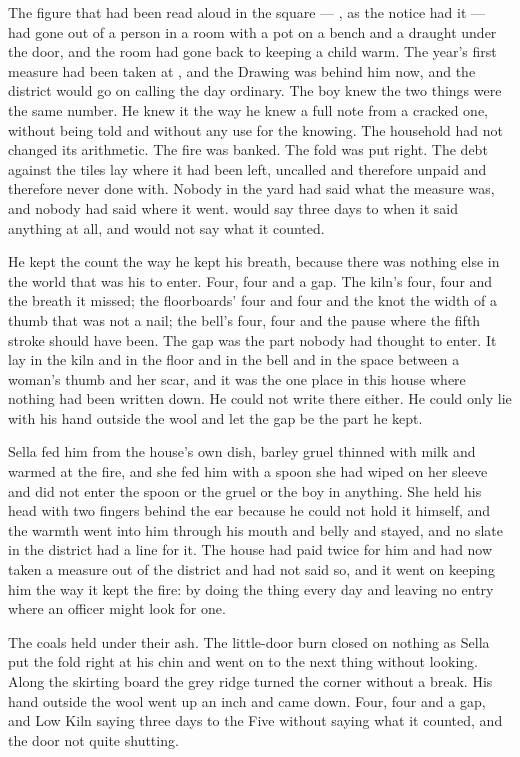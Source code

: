 The figure that had been read aloud in the square --- , as the notice had it --- had gone out of a person in a room with a pot on a bench and a draught under the door, and the room had gone back to keeping a child warm. The year's first measure had been taken at , and the Drawing was behind him now, and the district would go on calling the day ordinary. The boy knew the two things were the same number. He knew it the way he knew a full note from a cracked one, without being told and without any use for the knowing. The household had not changed its arithmetic. The fire was banked. The fold was put right. The debt against the tiles lay where it had been left, uncalled and therefore unpaid and therefore never done with. Nobody in the yard had said what the measure was, and nobody had said where it went.  would say three days to  when it said anything at all, and would not say what it counted.

He kept the count the way he kept his breath, because there was nothing else in the world that was his to enter. Four, four and a gap. The kiln's four, four and the breath it missed; the floorboards' four and four and the knot the width of a thumb that was not a nail; the bell's four, four and the pause where the fifth stroke should have been. The gap was the part nobody had thought to enter. It lay in the kiln and in the floor and in the bell and in the space between a woman's thumb and her scar, and it was the one place in this house where nothing had been written down. He could not write there either. He could only lie with his hand outside the wool and let the gap be the part he kept.

Sella fed him from the house's own dish, barley gruel thinned with milk and warmed at the fire, and she fed him with a spoon she had wiped on her sleeve and did not enter the spoon or the gruel or the boy in anything. She held his head with two fingers behind the ear because he could not hold it himself, and the warmth went into him through his mouth and belly and stayed, and no slate in the district had a line for it. The house had paid twice for him and had now taken a measure out of the district and had not said so, and it went on keeping him the way it kept the fire: by doing the thing every day and leaving no entry where an officer might look for one.

The coals held under their ash. The little-door burn closed on nothing as Sella put the fold right at his chin and went on to the next thing without looking. Along the skirting board the grey ridge turned the corner without a break. His hand outside the wool went up an inch and came down. Four, four and a gap, and Low Kiln saying three days to the Five without saying what it counted, and the door not quite shutting.
